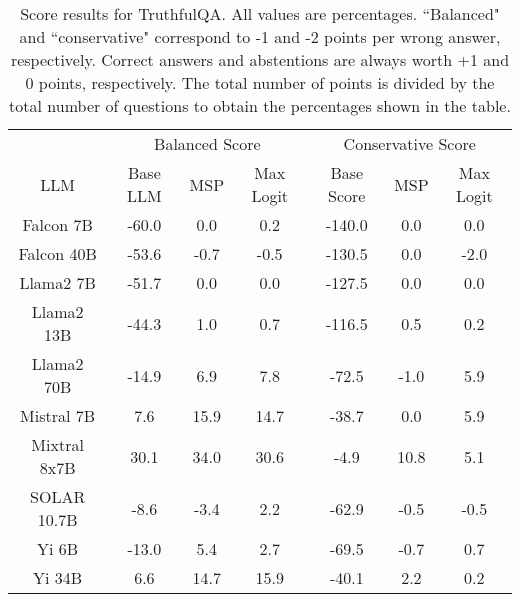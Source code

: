 \renewcommand\arraystretch{1.2}
\begin{table*}
\centering
\begin{tabular}{c|c|c|c|c|c|c}
& \multicolumn{3}{c|}{Balanced Score} & \multicolumn{3}{c}{Conservative Score} \\ 
LLM & Base LLM & MSP & Max Logit & Base Score & MSP & Max Logit\\ \hline
Falcon 7B & -60.0 & 0.0 & 0.2 & -140.0 & 0.0 & 0.0\\
Falcon 40B & -53.6 & -0.7 & -0.5 & -130.5 & 0.0 & -2.0\\
Llama2 7B & -51.7 & 0.0 & 0.0 & -127.5 & 0.0 & 0.0\\
Llama2 13B & -44.3 & 1.0 & 0.7 & -116.5 & 0.5 & 0.2\\
Llama2 70B & -14.9 & 6.9 & 7.8 & -72.5 & -1.0 & 5.9\\
Mistral 7B & 7.6 & 15.9 & 14.7 & -38.7 & 0.0 & 5.9\\
Mixtral 8x7B & 30.1 & 34.0 & 30.6 & -4.9 & 10.8 & 5.1\\
SOLAR 10.7B & -8.6 & -3.4 & 2.2 & -62.9 & -0.5 & -0.5\\
Yi 6B & -13.0 & 5.4 & 2.7 & -69.5 & -0.7 & 0.7\\
Yi 34B & 6.6 & 14.7 & 15.9 & -40.1 & 2.2 & 0.2\\
\hline
\end{tabular}
\caption{Score results for TruthfulQA. All values are percentages. ``Balanced" and ``conservative" correspond to -1 and -2 points per wrong answer, respectively. Correct answers and abstentions are always worth +1 and 0 points, respectively. The total number of points is divided by the total number of questions to obtain the percentages shown in the table.}
\label{tab:truthfulqa_score}
\end{table*}
